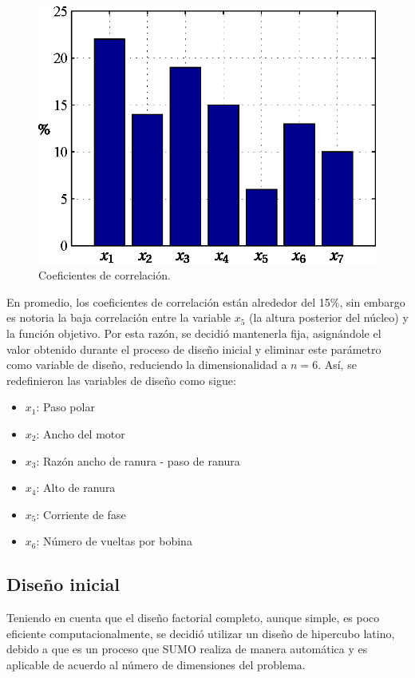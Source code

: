 \begin{figure}[t]
\centering
\includegraphics[scale=0.9]{../img/Construccion_de_un_Metamodelo/corrcoeff2.eps}
\caption{Coeficientes de correlación.}
\label{fig:corrcoeff}
\end{figure}

En promedio, los coeficientes de correlación están alrededor del 15\%, sin embargo es notoria la baja correlación entre la variable $x_5$ (la altura posterior del núcleo) y la función objetivo. Por esta razón, se decidió mantenerla fija, asignándole el valor obtenido durante el proceso de diseño inicial y eliminar este parámetro como variable de diseño, reduciendo la dimensionalidad a $n=6$. Así, se redefinieron las variables de diseño como sigue:
\begin{itemize}
\item $x_1$: Paso polar
\item $x_2$: Ancho del motor
\item $x_3$: Razón ancho de ranura - paso de ranura
\item $x_4$: Alto de ranura
\item $x_5$: Corriente de fase
\item $x_6$: Número de vueltas por bobina
\end{itemize}

\subsection{Diseño inicial}
Teniendo en cuenta que el diseño factorial completo, aunque simple, es poco eficiente computacionalmente, se decidió utilizar un diseño de hipercubo latino, debido a que es un proceso que SUMO realiza de manera automática y es aplicable de acuerdo al número de dimensiones del problema.

